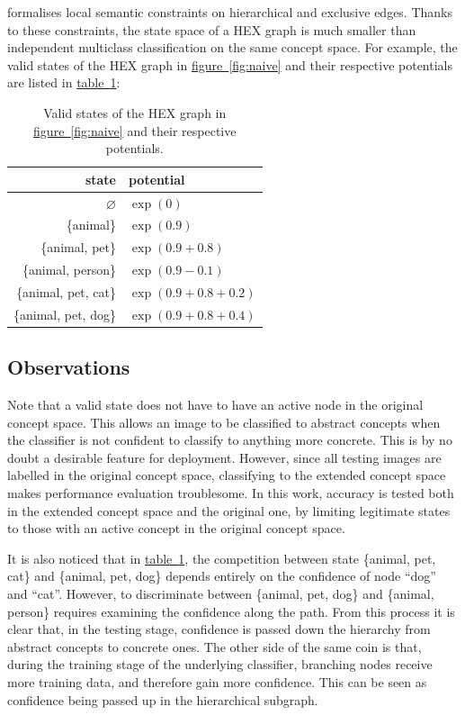 \documentclass[11pt,a4paper]{article}
\begin{document}
formalises local semantic constraints on hierarchical and exclusive edges. Thanks to these constraints, the state space of a HEX graph is much smaller than independent multiclass classification on the same concept space. For example, the valid states of the HEX graph in \hyperref[fig:naive]{figure~\ref{fig:naive}} and their respective potentials are listed in \hyperref[tab:naive]{table~\ref{tab:naive}}:
\begin{table}[h]
\centering
\begin{tabular}{r|l}
state & potential\\
\hline
$\varnothing$ & $\exp(0)$\\
\{animal\} & $\exp(0.9)$\\
\{animal, pet\} & $\exp(0.9+0.8)$\\
\{animal, person\} & $\exp(0.9-0.1)$\\
\{animal, pet, cat\} & $\exp(0.9+0.8+0.2)$\\
\{animal, pet, dog\} & $\exp(0.9+0.8+0.4)$
\end{tabular}
\caption{Valid states of the HEX graph in \hyperref[fig:naive]{figure~\ref{fig:naive}} and their respective potentials.}
\label{tab:naive}
\end{table}

\subsection{Observations}

Note that a valid state does not have to have an active node in the original concept space. This allows an image to be classified to abstract concepts when the classifier is not confident to classify to anything more concrete. This is by no doubt a desirable feature for deployment. However, since all testing images are labelled in the original concept space, classifying to the extended concept space makes performance evaluation troublesome. In this work, accuracy is tested both in the extended concept space and the original one, by limiting legitimate states to those with an active concept in the original concept space.

It is also noticed that in \hyperref[tab:naive]{table~\ref{tab:naive}}, the competition between state \{animal, pet, cat\} and \{animal, pet, dog\} depends entirely on the confidence of node ``dog'' and ``cat''. However, to discriminate between \{animal, pet, dog\} and \{animal, person\} requires examining the confidence along the path. From this process it is clear that, in the testing stage, confidence is passed down the hierarchy from abstract concepts to concrete ones. The other side of the same coin is that, during the training stage of the underlying classifier, branching nodes receive more training data, and therefore gain more confidence. This can be seen as confidence being passed up in the hierarchical subgraph.
\end{document}
